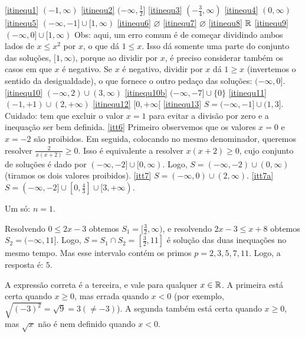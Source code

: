 \begin{Solution}{1.5}
 \eqref{itinequ1} $(-1,\infty)$
 \eqref{itinequ2} $(-\infty,\tfrac12]$
 \eqref{itinequ3} $(-\tfrac34,\infty)$
 \eqref{itinequ4} $(0,\infty)$
 \eqref{itinequ5} $(-\infty,-1]\cup [1,\infty)$
 \eqref{itinequ6} $\varnothing$
 \eqref{itinequ7} $\varnothing$
 \eqref{itinequ8} $\mathbb{R}$
 \eqref{itinequ9} $(-\infty,0]\cup [1,\infty)$ Obs: aqui, um erro comum é de começar
dividindo ambos lados de $x\leq x^2$ por $x$, o que dá $1\leq x$. Isso dá somente uma
parte do conjunto das soluções, $[1,\infty)$, porque ao dividir por $x$, é preciso
considerar também os casos em que $x$ é negativo. Se $x$ é negativo, dividir por $x$ dá
$1\geq x$ (invertemos o sentido da desigualdade), o que fornece o outro pedaço das
soluções: $(-\infty,0]$.
 \eqref{itinequ10} $(-\infty,2)\cup (3,\infty)$
\eqref{itinequ10b} $(-\infty,-7]\cup \{0\}$
 \eqref{itinequ11} $(-1,+1)\cup (2,+\infty)$
\eqref{itinequ12} $[0,+\infty[$
\eqref{itinequ13} $S=(-\infty,-1]\cup (1,3]$. Cuidado: tem que excluir o valor
$x=1$ para evitar a divisão por zero e a inequação ser bem
definida.
\eqref{itt6} Primeiro observemos que os
valores $x=0$ e $x=-2$ são proibidos. Em seguida, colocando no mesmo denominador,
queremos resolver $\frac{2}{x(x+2)}\geq 0$. Isso é equivalente a resolver $x(x+2)\geq 0$,
cujo conjunto de soluções é dado por $(-\infty,-2]\cup [0,\infty)$. Logo,
$S=(-\infty,-2)\cup (0,\infty)$ (tiramos os dois valores proibidos).
\eqref{itt7} $S=(-\infty,0)\cup(2,\infty)$.
\eqref{itt7a} $S=(-\infty,-2]\cup [0,\tfrac43]\cup [3,+\infty)$.
\end{Solution}
\begin{Solution}{1.6}
Um só: $n=1$.
\end{Solution}
\begin{Solution}{1.7}
Resolvendo $0\leq 2x-3$ obtemos $S_1=[\tfrac32,\infty)$, e resolvendo $2x-3\leq
x+8$ obtemos $S_2=(-\infty,11]$. Logo, $S=S_1\cap S_2=[\tfrac32,11]$ é solução
das duas inequações no mesmo tempo. Mas esse intervalo contém os primos
$p=2,3,5,7,11$. Logo, a resposta é: $5$.
\end{Solution}
\begin{Solution}{1.8}
A expressão correta é a terceira, e vale para qualquer $x\in \mathbb{R}$.
A primeira está certa quando $x\geq 0$, mas errada quando $x<0$ (por exemplo,
$\sqrt{(-3)^2}=\sqrt{9}=3(\neq -3)$). A segunda também está certa quando $x\geq
0$, mas $\sqrt{x}$ não é nem definido quando $x<0$.
\end{Solution}
